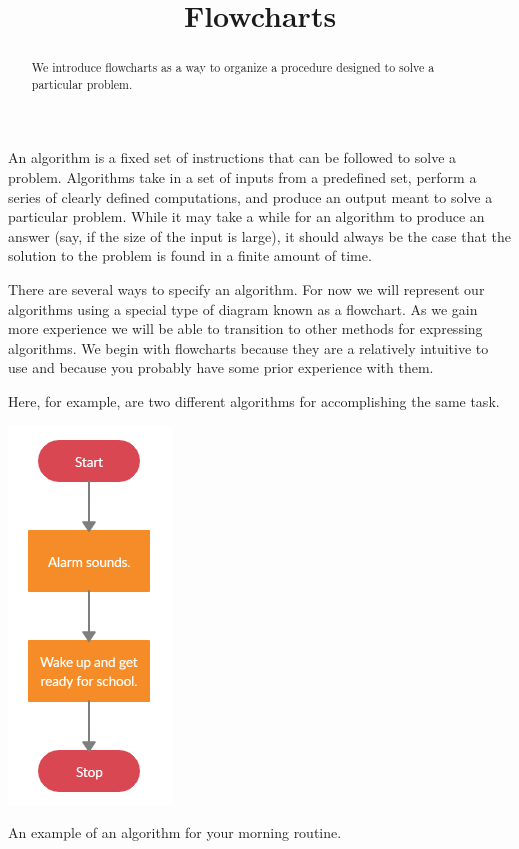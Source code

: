 \documentclass{ximera}
\title{Flowcharts}
\begin{document}
  
\begin{abstract}  
We introduce flowcharts as a way to organize a procedure designed to solve a particular problem.
\end{abstract}  
\maketitle

An algorithm is a fixed set of instructions that can be followed to solve a problem. Algorithms take in a set of inputs from a predefined set, perform a series of clearly defined computations, and produce an output meant to solve a particular problem. While it may take a while for an algorithm to produce an answer (say, if the size of the input is large), it should always be the case that the solution to the problem is found in a finite amount of time.


There are several ways to specify an algorithm. For now we will represent our algorithms using a special type of diagram known as a flowchart. As we gain more experience we will be able to transition to other methods for expressing algorithms. We begin with flowcharts because they are a relatively intuitive to use and because you probably have some prior experience with them.


Here, for example, are two different algorithms for accomplishing the same task. 

\begin{center}
	\includegraphics{morning1.png}
\end{center}
\begin{center}
	An example of an algorithm for your morning routine.
\end{center}
\end{document}
